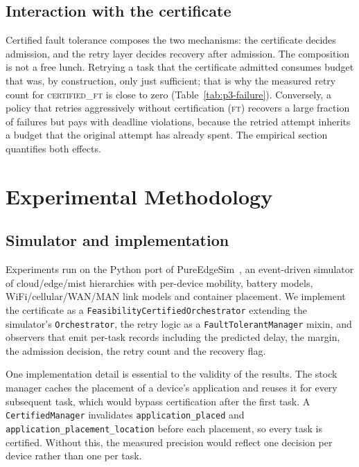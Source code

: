 \documentclass[journal,10pt]{IEEEtran}
\begin{document}
\subsection{Interaction with the certificate}
Certified fault tolerance composes the two mechanisms: the certificate decides
admission, and the retry layer decides recovery after admission. The
composition is not a free lunch. Retrying a task that the certificate admitted
consumes budget that was, by construction, only just sufficient; that is why
the measured retry count for \textsc{certified\_ft} is close to zero
(Table~\ref{tab:p3-failure}). Conversely, a policy that retries aggressively
without certification (\textsc{ft}) recovers a large fraction of failures but
pays with deadline violations, because the retried attempt inherits a budget
that the original attempt has already spent. The empirical section quantifies
both effects.

\section{Experimental Methodology}
\label{sec:method}

\subsection{Simulator and implementation}
Experiments run on the Python port of PureEdgeSim~\cite{mechalikh2021pureedgesim},
an event-driven simulator of cloud/edge/mist hierarchies with per-device
mobility, battery models, WiFi/cellular/WAN/MAN link models and container
placement. We implement the certificate as a \texttt{FeasibilityCertified\-Orchestrator}
extending the simulator's \texttt{Orchestrator}, the retry logic as a
\texttt{FaultTolerantManager} mixin, and observers that emit per-task records
including the predicted delay, the margin, the admission decision, the retry
count and the recovery flag.

One implementation detail is essential to the validity of the results. The
stock manager caches the placement of a device's application and reuses it for
every subsequent task, which would bypass certification after the first task.
A \texttt{CertifiedManager} invalidates \texttt{application\_placed} and
\texttt{application\_placement\_location} before each placement, so every task
is certified. Without this, the measured precision would reflect one decision
per device rather than one per task.
\end{document}
